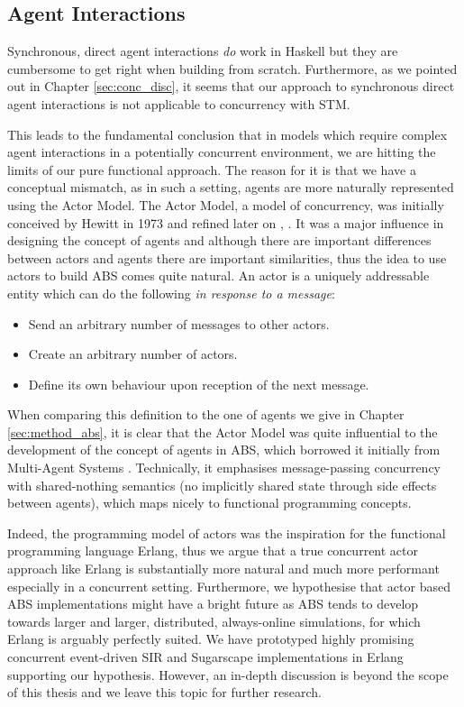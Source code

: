 \subsection{Agent Interactions}
Synchronous, direct agent interactions \textit{do} work in Haskell but they are cumbersome to get right when building from scratch. Furthermore, as we pointed out in Chapter \ref{sec:conc_disc}, it seems that our approach to synchronous direct agent interactions is not applicable to concurrency with STM. 

This leads to the fundamental conclusion that in models which require complex agent interactions in a potentially concurrent environment, we are hitting the limits of our pure functional approach. The reason for it is that we have a conceptual mismatch, as in such a setting, agents are more naturally represented using the Actor Model. The Actor Model, a model of concurrency, was initially conceived by Hewitt in 1973 \cite{hewitt_universal_1973} and refined later on \cite{hewitt_what_2007}, \cite{hewitt_actor_2010}. It was a major influence in designing the concept of agents and although there are important differences between actors and agents there are important similarities, thus the idea to use actors to build ABS comes quite natural.
An actor is a uniquely addressable entity which can do the following \textit{in response to a message}:
\begin{itemize}
	\item Send an arbitrary number of messages to other actors.
	\item Create an arbitrary number of actors.
	\item Define its own behaviour upon reception of the next message.
\end{itemize}

When comparing this definition to the one of agents we give in Chapter \ref{sec:method_abs}, it is clear that the Actor Model was quite influential to the development of the concept of agents in ABS, which borrowed it initially from Multi-Agent Systems \cite{wooldridge_introduction_2009}. Technically, it emphasises message-passing concurrency with shared-nothing semantics (no implicitly shared state through side effects between agents), which maps nicely to functional programming concepts.

Indeed, the programming model of actors \cite{agha_actors:_1986} was the inspiration for the functional programming language Erlang, thus we argue that a true concurrent actor approach like Erlang is substantially more natural and much more performant especially in a concurrent setting. Furthermore, we hypothesise that actor based ABS implementations might have a bright future as ABS tends to develop towards larger and larger, distributed, always-online simulations, for which Erlang is arguably perfectly suited. We have prototyped highly promising concurrent event-driven SIR and Sugarscape implementations in Erlang supporting our hypothesis. However, an in-depth discussion is beyond the scope of this thesis and we leave this topic for further research.

